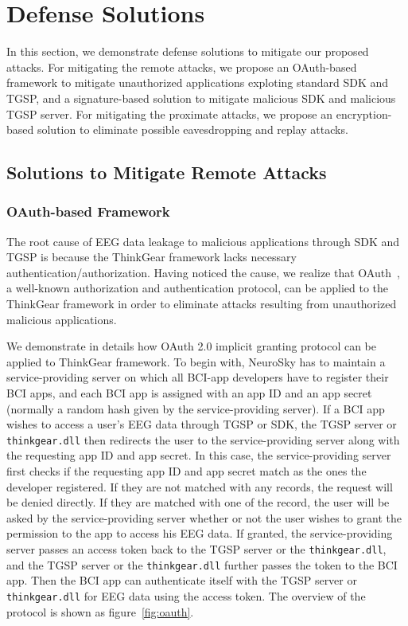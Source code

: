 \section{Defense Solutions}
\label{sec:defense}

In this section, we demonstrate defense solutions to mitigate our proposed attacks. For mitigating the remote attacks, we propose an OAuth-based framework to mitigate unauthorized applications exploting standard SDK and TGSP, and a signature-based solution to mitigate malicious SDK and malicious TGSP server. For mitigating the proximate attacks, we propose an encryption-based solution to eliminate possible eavesdropping and replay attacks.

\subsection{Solutions to Mitigate Remote Attacks}

\subsubsection{OAuth-based Framework}
The root cause of EEG data leakage to malicious applications through SDK and TGSP is because the ThinkGear framework lacks necessary authentication/authorization. Having noticed the cause, we realize that OAuth~\cite{hardt2012oauth}, a well-known authorization and authentication protocol, can be applied to the ThinkGear framework in order to eliminate attacks resulting from unauthorized malicious applications.

We demonstrate in details how OAuth 2.0 implicit granting protocol can be applied to ThinkGear framework. To begin with, NeuroSky has to maintain a service-providing server on which all BCI-app developers have to register their BCI apps, and each BCI app is assigned with an app ID and an app secret (normally a random hash given by the service-providing server). If a BCI app wishes to access a user's EEG data through TGSP or SDK, the TGSP server or \texttt{thinkgear.dll} then redirects the user to the service-providing server along with the requesting app ID and app secret. In this case, the service-providing server first checks if the requesting app ID and app secret match as the ones the developer registered. If they are not matched with any records, the request will be denied directly. If they are matched with one of the record, the user will be asked by the service-providing server whether or not the user wishes to grant the permission to the app to access his EEG data. If granted, the service-providing server passes an access token back to the TGSP server or the \texttt{thinkgear.dll}, and the TGSP server or the \texttt{thinkgear.dll} further passes the token to the BCI app. Then the BCI app can authenticate itself with the TGSP server or \texttt{thinkgear.dll} for EEG data using the access token. The overview of the protocol is shown as figure~\ref{fig:oauth}.

